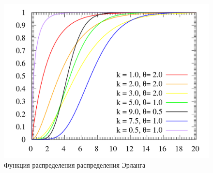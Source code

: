 \begin{figure}[H]
    \begin{center}
    \includegraphics[width=0.5\linewidth]{assets/erlang_Fx.png}
    \caption{Функция распределения распределения Эрланга}
    \label{fig:}
    \end{center}
\end{figure}
